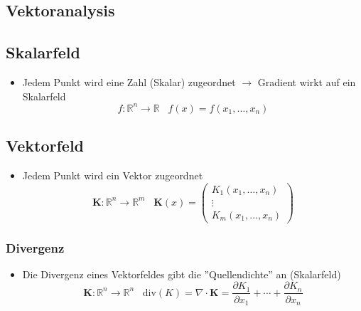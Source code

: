 \documentclass[a3paper, 11pt, landscape]{scrartcl}
\begin{document}
\begin{multicols*}{3}
	\section{Vektoranalysis}
    \subsection{Skalarfeld}
    	\begin{itemize}
    	    \item Jedem Punkt wird eine Zahl (Skalar) zugeordnet $\rightarrow$ Gradient wirkt auf ein Skalarfeld
    	\begin{equation*}
    		f: \mathbb{R}^n \rightarrow \mathbb{R} \hspace{10pt} f(x)=f(x_1, \dots, x_n)
    	\end{equation*}
    	\end{itemize}
    \subsection{Vektorfeld}
    	\begin{itemize}
    	    \item Jedem Punkt wird ein Vektor zugeordnet
        	\begin{equation*}
        		\textbf{K}: \mathbb{R}^n \rightarrow \mathbb{R}^m \hspace{10pt} \textbf{K}(x)=
        		\begin{pmatrix}
        			K_1(x_1, \dots, x_n)\\
        			\vdots\\
        			K_m(x_1, \dots, x_n)
        		\end{pmatrix}
        	\end{equation*}
    	\end{itemize}
    	\subsubsection{Divergenz}
    		\begin{itemize}
    		    \item Die Divergenz eines Vektorfeldes gibt die ''Quellendichte'' an (Skalarfeld)
        		\begin{equation*}
        			\textbf{K}: \mathbb{R}^n \rightarrow \mathbb{R}^n \hspace{10pt} \text{div}(K)=\nabla \cdot \textbf{K}=\frac{\partial K_1}{\partial x_1}+ \cdots +\frac{\partial K_n}{\partial x_n}
        		\end{equation*}
    		\end{itemize}

\end{multicols*}
\end{document}
